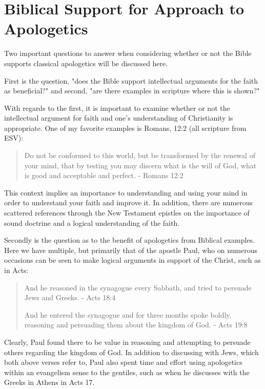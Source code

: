 \documentclass[12pt]{turabian-researchpaper}
\begin{document}
\section{Biblical Support for Approach to Apologetics}

Two important  questions to answer when considering whether or not the Bible supports classical apologetics will be discussed here.

First is the question, "does the Bible support intellectual arguments for the faith as beneficial?" and second, "are there examples in scripture where this is shown?"

With regards to the first, it is important to examine whether or not the intellectual argument for faith and one's understanding of Christianity is appropriate. One of my favorite examples is Romans, 12:2 (all scripture from ESV):

\begin{quotation}
Do not be conformed to this world, but be transformed by the renewal of your mind, that by testing you may discern what is the will of God, what is good and acceptable and perfect.\autocite{bible2002wheaton} - Romans 12:2
\end{quotation}

This context implies an importance to understanding and using your mind in order to understand your faith and improve it. In addition, there are numerous scattered references through the New Testament epistles on the importance of sound doctrine and a logical understanding of the faith. 

Secondly is the question as to the benefit of apologetics from Biblical examples. Here we have multiple, but primarily that of the apostle Paul, who on numerous occasions can be seen to make logical arguments in support of the Christ, such as in Acts:

\begin{quotation}
And he reasoned in the synagogue every Sabbath, and tried to persuade Jews and Greeks. - Acts 18:4

And he entered the synagogue and for three months spoke boldly, reasoning and persuading them about the kingdom of God. - Acts 19:8
\end{quotation}

Clearly, Paul found there to be value in reasoning and attempting to persuade others regarding the kingdom of God. In addition to discussing with Jews, which both above verses refer to, Paul also spent time and effort using apologetics within an evangelism sense to the gentiles, such as when he discusses with the Greeks in Athens in Acts 17. 
\end{document}
